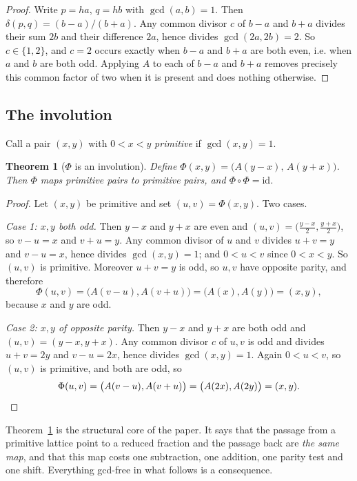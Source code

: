\documentclass[11pt,a4paper]{article}
\theoremstyle{plain}
\newtheorem{theorem}{Theorem}[section]
\theoremstyle{definition}
\theoremstyle{remark}
\begin{document}
\begin{proof}
Write $p = ha$, $q = hb$ with $\gcd(a,b) = 1$. Then
$\delta(p,q) = (b-a)/(b+a)$. Any common divisor $c$ of $b-a$ and $b+a$ divides
their sum $2b$ and their difference $2a$, hence divides $\gcd(2a,2b) = 2$. So
$c \in \{1,2\}$, and $c = 2$ occurs exactly when $b-a$ and $b+a$ are both even,
i.e. when $a$ and $b$ are both odd. Applying $A$ to each of $b-a$ and $b+a$
removes precisely this common factor of two when it is present and does nothing
otherwise.
\end{proof}

\subsection{The involution}

Call a pair $(x,y)$ with $0 < x < y$ \emph{primitive} if $\gcd(x,y) = 1$.

\begin{theorem}[$\Phi$ is an involution]\label{thm:involution}
Define $\Phi(x,y) = \bigl(A(y-x),\, A(y+x)\bigr)$. Then $\Phi$ maps primitive
pairs to primitive pairs, and $\Phi \circ \Phi = \mathrm{id}$.
\end{theorem}

\begin{proof}
Let $(x,y)$ be primitive and set $(u,v) = \Phi(x,y)$. Two cases.

\emph{Case 1: $x, y$ both odd.} Then $y-x$ and $y+x$ are even and
$(u,v) = \bigl(\tfrac{y-x}{2}, \tfrac{y+x}{2}\bigr)$, so $v-u = x$ and
$v+u = y$. Any common divisor of $u$ and $v$ divides $u+v = y$ and $v-u = x$,
hence divides $\gcd(x,y) = 1$; and $0 < u < v$ since $0 < x < y$. So $(u,v)$ is
primitive. Moreover $u + v = y$ is odd, so $u,v$ have opposite parity, and
therefore
\[
  \Phi(u,v) = \bigl(A(v-u), A(v+u)\bigr) = \bigl(A(x), A(y)\bigr) = (x,y),
\]
because $x$ and $y$ are odd.

\emph{Case 2: $x, y$ of opposite parity.} Then $y-x$ and $y+x$ are both odd and
$(u,v) = (y-x, y+x)$. Any common divisor $c$ of $u,v$ is odd and divides
$u+v = 2y$ and $v-u = 2x$, hence divides $\gcd(x,y) = 1$. Again $0<u<v$, so
$(u,v)$ is primitive, and both are odd, so
\[
  \Phi(u,v) = \bigl(A(v-u), A(v+u)\bigr) = \bigl(A(2x), A(2y)\bigr) = (x,y). \qedhere
\]
\end{proof}

Theorem~\ref{thm:involution} is the structural core of the paper. It says that
the passage from a primitive lattice point to a reduced fraction and the passage
back are \emph{the same map}, and that this map costs one subtraction, one
addition, one parity test and one shift. Everything gcd-free in what follows is
a consequence.
\end{document}
